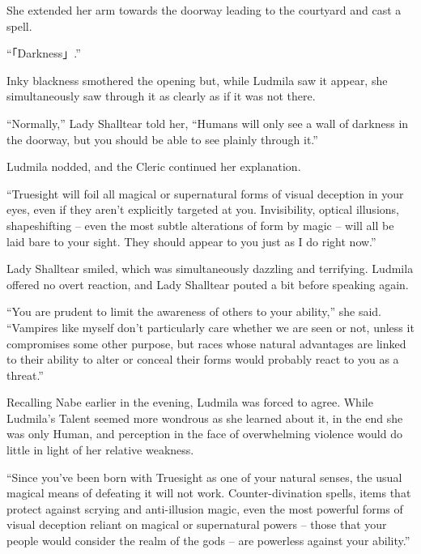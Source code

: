  

She extended her arm towards the doorway leading to the courtyard and cast a spell.

 

“「Darkness」.”

 

Inky blackness smothered the opening but, while Ludmila saw it appear, she simultaneously saw through it as clearly as if it was not there.

 

“Normally,” Lady Shalltear told her, “Humans will only see a wall of darkness in the doorway, but you should be able to see plainly through it.”

 

Ludmila nodded, and the Cleric continued her explanation.

 

“Truesight will foil all magical or supernatural forms of visual deception in your eyes, even if they aren’t explicitly targeted at you. Invisibility, optical illusions, shapeshifting – even the most subtle alterations of form by magic – will all be laid bare to your sight. They should appear to you just as I do right now.”

 

Lady Shalltear smiled, which was simultaneously dazzling and terrifying. Ludmila offered no overt reaction, and Lady Shalltear pouted a bit before speaking again.

 

“You are prudent to limit the awareness of others to your ability,” she said. “Vampires like myself don’t particularly care whether we are seen or not, unless it compromises some other purpose, but races whose natural advantages are linked to their ability to alter or conceal their forms would probably react to you as a threat.”

 

Recalling Nabe earlier in the evening, Ludmila was forced to agree. While Ludmila’s Talent seemed more wondrous as she learned about it, in the end she was only Human, and perception in the face of overwhelming violence would do little in light of her relative weakness.

 

“Since you’ve been born with Truesight as one of your natural senses, the usual magical means of defeating it will not work. Counter-divination spells, items that protect against scrying and anti-illusion magic, even the most powerful forms of visual deception reliant on magical or supernatural powers – those that your people would consider the realm of the gods – are powerless against your ability.”

